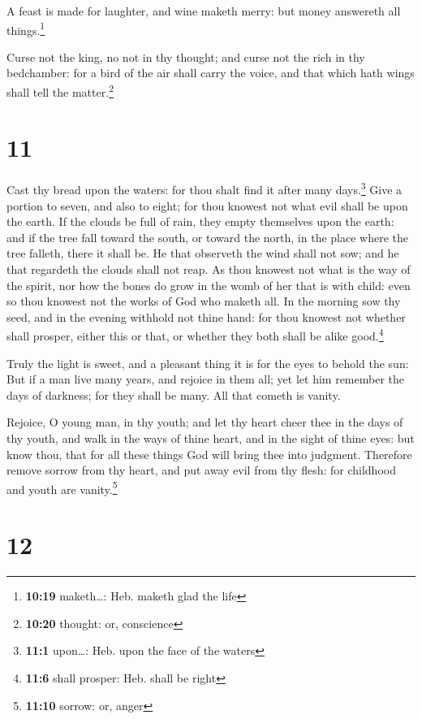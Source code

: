  A feast is made for laughter, and wine maketh merry: but
money answereth all things.\footnote{\textbf{10:19} maketh\ldots: Heb.
  maketh glad the life}

 Curse not the king, no not in thy thought; and curse not
the rich in thy bedchamber: for a bird of the air shall carry the voice,
and that which hath wings shall tell the matter.\footnote{\textbf{10:20}
  thought: or, conscience}

\hypertarget{section-10}{%
\section{11}\label{section-10}}

 Cast thy bread upon the waters: for thou shalt find it
after many days.\footnote{\textbf{11:1} upon\ldots: Heb. upon the face
  of the waters}  Give a portion to seven, and also to
eight; for thou knowest not what evil shall be upon the earth.
 If the clouds be full of rain, they empty themselves upon
the earth: and if the tree fall toward the south, or toward the north,
in the place where the tree falleth, there it shall be. 
He that observeth the wind shall not sow; and he that regardeth the
clouds shall not reap.  As thou knowest not what is the
way of the spirit, nor how the bones do grow in the womb of her that is
with child: even so thou knowest not the works of God who maketh all.
 In the morning sow thy seed, and in the evening withhold
not thine hand: for thou knowest not whether shall prosper, either this
or that, or whether they both shall be alike good.\footnote{\textbf{11:6}
  shall prosper: Heb. shall be right}

 Truly the light is sweet, and a pleasant thing it is for
the eyes to behold the sun:  But if a man live many years,
and rejoice in them all; yet let him remember the days of darkness; for
they shall be many. All that cometh is vanity.

 Rejoice, O young man, in thy youth; and let thy heart
cheer thee in the days of thy youth, and walk in the ways of thine
heart, and in the sight of thine eyes: but know thou, that for all these
things God will bring thee into judgment.  Therefore
remove sorrow from thy heart, and put away evil from thy flesh: for
childhood and youth are vanity.\footnote{\textbf{11:10} sorrow: or,
  anger}

\hypertarget{section-11}{%
\section{12}\label{section-11}}

